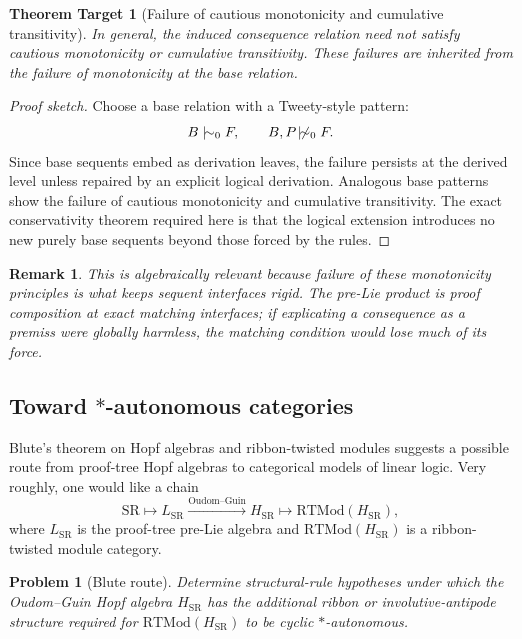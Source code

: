 \documentclass[11pt]{article}
\newtheorem{remark}[theorem]{Remark}
\newtheorem{problem}[theorem]{Problem}
\newtheorem{target}[theorem]{Theorem Target}
\newcommand{\mszero}{\mathrel{\mid\!\sim_{0}}}
\newcommand{\nmszero}{\mathrel{\not\!\mid\!\sim_{0}}}
\begin{document}
\begin{target}[Failure of cautious monotonicity and cumulative transitivity]
In general, the induced consequence relation need not satisfy cautious
monotonicity or cumulative transitivity.  These failures are inherited from
the failure of monotonicity at the base relation.
\end{target}

\begin{proof}[Proof sketch]
Choose a base relation with a Tweety-style pattern:
\[
B\mszero F,
\qquad
B,P\nmszero F.
\]
Since base sequents embed as derivation leaves, the failure persists at the
derived level unless repaired by an explicit logical derivation.  Analogous
base patterns show the failure of cautious monotonicity and cumulative
transitivity.  The exact conservativity theorem required here is that the
logical extension introduces no new purely base sequents beyond those forced
by the rules.
\end{proof}

\begin{remark}
This is algebraically relevant because failure of these monotonicity
principles is what keeps sequent interfaces rigid.  The pre-Lie product is
proof composition at exact matching interfaces; if explicating a consequence
as a premiss were globally harmless, the matching condition would lose much
of its force.
\end{remark}

\subsection{Toward \texorpdfstring{\(\ast\)}{*}-autonomous categories}

Blute's theorem on Hopf algebras and ribbon-twisted modules suggests a
possible route from proof-tree Hopf algebras to categorical models of linear
logic.  Very roughly, one would like a chain
\[
\mathrm{SR}
\longmapsto
L_{\mathrm{SR}}
\xrightarrow{\mathrm{Oudom\text{--}Guin}}
H_{\mathrm{SR}}
\longmapsto
\mathrm{RTMod}(H_{\mathrm{SR}}),
\]
where \(L_{\mathrm{SR}}\) is the proof-tree pre-Lie algebra and
\(\mathrm{RTMod}(H_{\mathrm{SR}})\) is a ribbon-twisted module category.

\begin{problem}[Blute route]
Determine structural-rule hypotheses under which the Oudom--Guin Hopf algebra
\(H_{\mathrm{SR}}\) has the additional ribbon or involutive-antipode
structure required for \(\mathrm{RTMod}(H_{\mathrm{SR}})\) to be cyclic
\(\ast\)-autonomous.
\end{problem}
\end{document}
